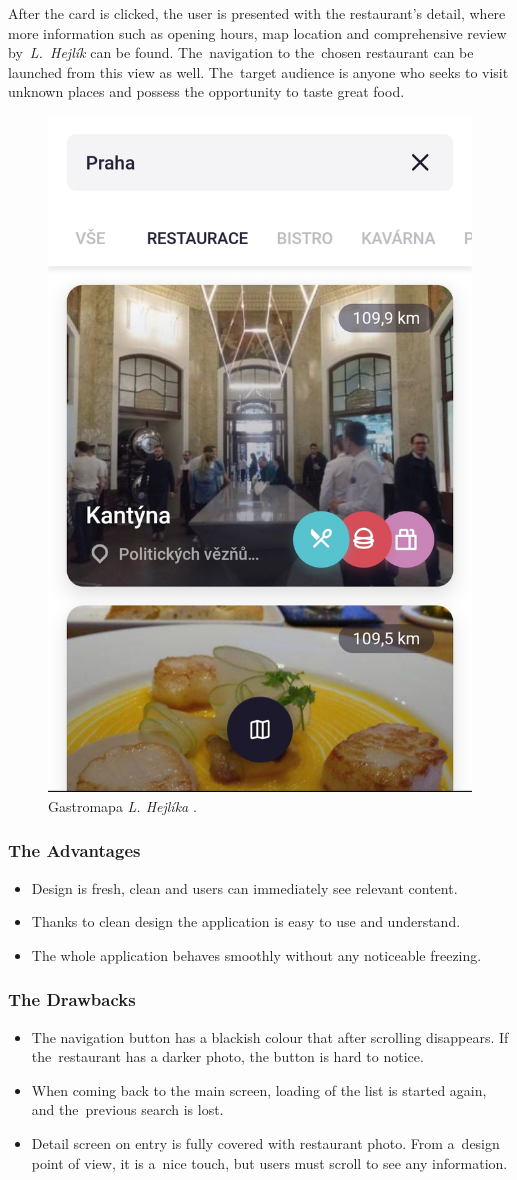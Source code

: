After the card is clicked, the user is presented with the restaurant's detail, where more information such as opening hours, map location and comprehensive review by~\textit{L.~Hejlík} can be found. The~navigation to the~chosen restaurant can be launched from this view as well. The~target audience is anyone who seeks to visit unknown places and possess the opportunity to taste great food.

\begin{figure}[ht]
    \centering
    \includegraphics[width=0.33\linewidth]{img/analysis/app-hejlik.jpg}
    \caption{Gastromapa \textit{L. Hejlíka} \cite{app-hejlik}.}
    \label{fig:gastromapa-hejlik}
\end{figure}

\subsubsection{The Advantages}
\begin{itemize}
    \item Design is fresh, clean and users can immediately see relevant content.
    \item Thanks to clean design the application is easy to use and understand.
    \item The whole application behaves smoothly without any noticeable freezing.
\end{itemize}

\subsubsection{The Drawbacks}
\begin{itemize}
    \item The navigation button has a blackish colour that after scrolling disappears. If the~restaurant has a darker photo, the button is hard to notice. 
    \item When coming back to the main screen, loading of the list is started again, and the~previous search is lost.
    \item Detail screen on entry is fully covered with restaurant photo. From a~design point of view, it is a~nice touch, but users must scroll to see any information. 
\end{itemize}

